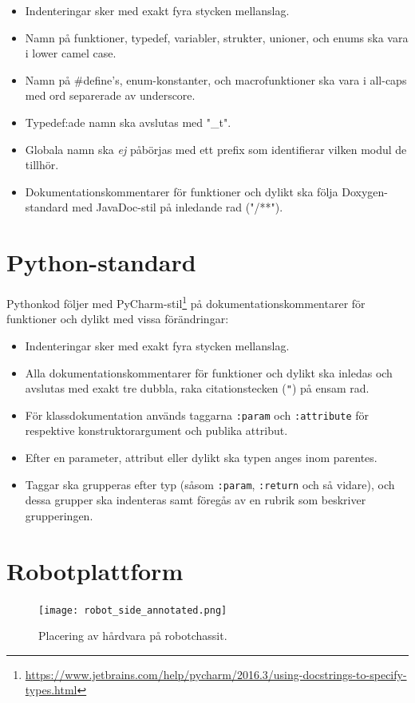 \documentclass[a4paper,11pt]{article}
\begin{document}
\begin{appendices}
\begin{itemize}
    \item Indenteringar sker med exakt fyra stycken mellanslag.
    \item Namn på funktioner, typedef, variabler, strukter, unioner, och enums ska vara i lower camel case.
    \item Namn på \#define's, enum-konstanter, och macrofunktioner ska vara i all-caps med ord separerade av underscore.
    \item Typedef:ade namn ska avslutas med "\_t".
    \item Globala namn ska \textit{ej} påbörjas med ett prefix som identifierar vilken modul de tillhör.
    \item Dokumentationskommentarer för funktioner och dylikt ska följa Doxygen-standard med JavaDoc-stil på inledande rad ("/**").
\end{itemize}

\clearpage
\section{Python-standard} \label{app:pythonstandard}
Pythonkod följer \cite{pep8} med PyCharm-stil\footnote{\url{https://www.jetbrains.com/help/pycharm/2016.3/using-docstrings-to-specify-types.html}} på dokumentationskommentarer för funktioner och dylikt med vissa förändringar:

\begin{itemize}
    \item Indenteringar sker med exakt fyra stycken mellanslag.
    \item Alla dokumentationskommentarer för funktioner och dylikt ska inledas och avslutas med exakt tre dubbla, raka citationstecken (\texttt{"}) på ensam rad.
    \item För klassdokumentation används taggarna \texttt{:param} och \texttt{:attribute} för respektive konstruktorargument och publika attribut.
    \item Efter en parameter, attribut eller dylikt ska typen anges inom parentes.
    \item Taggar ska grupperas efter typ (såsom \texttt{:param}, \texttt{:return} och så vidare), och dessa grupper ska indenteras samt föregås av en rubrik som beskriver grupperingen.
\end{itemize}

\clearpage
\section{Robotplattform}
\label{app:placement}
\begin{figure}[h!]
    \centering
    \texttt{[image: robot\_side\_annotated.png]}
    \caption{Placering av hårdvara på robotchassit.}
    \label{fig:placement}
\end{figure}
\end{appendices}
\end{document}
